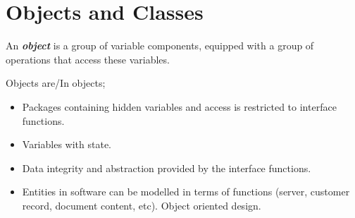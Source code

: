 \section{Objects and Classes}
\label{sec:obj-class}

An \textit{\textbf{object}} is a group of variable components, equipped with a group of operations that access these variables.

\noindent Objects are/In objects;
\begin{itemize}
  \item Packages containing hidden variables and access is restricted to interface functions.
  \item Variables with state.
  \item Data integrity and abstraction provided by the interface functions.
  \item Entities in software can be modelled in terms of functions (server, customer record, document content, etc). Object oriented design.
\end{itemize}




